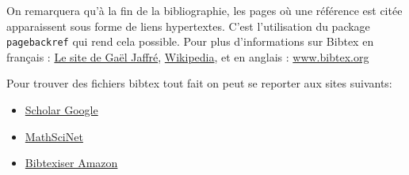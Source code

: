On remarquera qu'à la fin de la bibliographie, les pages où une référence est citée apparaissent sous
 forme de liens hypertextes. C'est l'utilisation du package \lstinline+pagebackref+ qui rend cela possible.
Pour plus d'informations sur Bibtex en français : 
\href{http://www.irit.fr/~Alain.Crouzil/jaffre/LOGICIELS/LATEX_BIBTEX/bibtex1.html}{Le site de Gaël Jaffré},
\href{http://fr.wikipedia.org/wiki/BibTeX}{Wikipedia},  
et en anglais :  \href{http://www.bibtex.org/}{www.bibtex.org} 

Pour trouver des fichiers bibtex tout fait on peut se reporter aux sites suivants:

\begin{itemize}
 \item \href{http://scholar.google.com/}{Scholar Google}
 \item \href{http://ams.u-strasbg.fr/mathscinet/}{MathSciNet}
 \item \href{http://lead.to/amazon/en/}{Bibtexiser Amazon}
\end{itemize}

